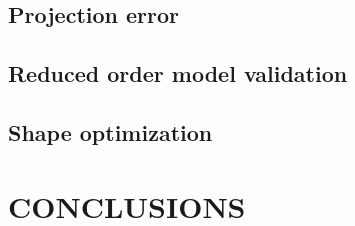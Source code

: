 \documentclass[a4paper]{eccomas_paper-2024}
\begin{document}
\subsection{Projection error} %
\label{sub:Projection error}


\subsection{Reduced order model validation} %
\label{sub:Reduced order model validation}


\subsection{Shape optimization} %
\label{sub:Shape optimization}


\section{CONCLUSIONS} %
\label{sec:conclusions}





\end{document}
